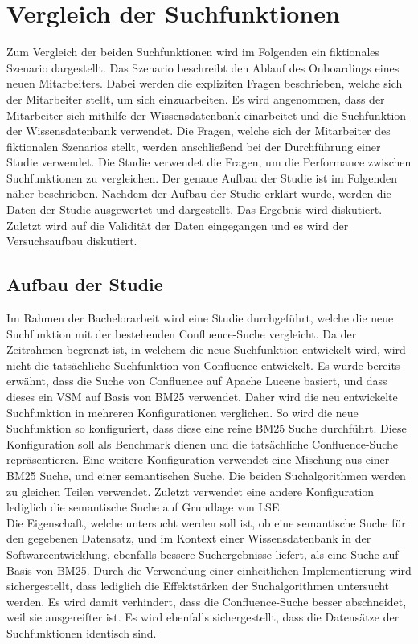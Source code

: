 \chapter{Vergleich der Suchfunktionen}
\label{chap:vergleich-der-suchfunktionen}

Zum Vergleich der beiden Suchfunktionen wird im Folgenden ein fiktionales Szenario dargestellt.
Das Szenario beschreibt den Ablauf des Onboardings eines neuen Mitarbeiters.
Dabei werden die expliziten Fragen beschrieben, welche sich der Mitarbeiter stellt, um sich einzuarbeiten.
Es wird angenommen, dass der Mitarbeiter sich mithilfe der Wissensdatenbank einarbeitet und die Suchfunktion der Wissensdatenbank verwendet.
Die Fragen, welche sich der Mitarbeiter des fiktionalen Szenarios stellt, werden anschließend bei der Durchführung einer Studie verwendet.
Die Studie verwendet die Fragen, um die Performance zwischen Suchfunktionen zu vergleichen.
Der genaue Aufbau der Studie ist im Folgenden näher beschrieben.
Nachdem der Aufbau der Studie erklärt wurde, werden die Daten der Studie ausgewertet und dargestellt.
Das Ergebnis wird diskutiert.
Zuletzt wird auf die Validität der Daten eingegangen und es wird der Versuchsaufbau diskutiert.

\section{Aufbau der Studie}
Im Rahmen der Bachelorarbeit wird eine Studie durchgeführt, welche die neue Suchfunktion mit der bestehenden Confluence-Suche vergleicht.
Da der Zeitrahmen begrenzt ist, in welchem die neue Suchfunktion entwickelt wird, wird nicht die tatsächliche Suchfunktion von Confluence entwickelt.
Es wurde bereits erwähnt, dass die Suche von Confluence auf Apache Lucene basiert, und dass dieses ein VSM auf Basis von BM25 verwendet.
Daher wird die neu entwickelte Suchfunktion in mehreren Konfigurationen verglichen.
So wird die neue Suchfunktion so konfiguriert, dass diese eine reine BM25 Suche durchführt.
Diese Konfiguration soll als Benchmark dienen und die tatsächliche Confluence-Suche repräsentieren.
Eine weitere Konfiguration verwendet eine Mischung aus einer BM25 Suche, und einer semantischen Suche.
Die beiden Suchalgorithmen werden zu gleichen Teilen verwendet.
Zuletzt verwendet eine andere Konfiguration lediglich die semantische Suche auf Grundlage von LSE.\\

Die Eigenschaft, welche untersucht werden soll ist, ob eine semantische Suche für den gegebenen Datensatz, und im Kontext einer Wissensdatenbank in der Softwareentwicklung, ebenfalls bessere Suchergebnisse liefert, als eine Suche auf Basis von BM25.
Durch die Verwendung einer einheitlichen Implementierung wird sichergestellt, dass lediglich die Effektstärken der Suchalgorithmen untersucht werden.
Es wird damit verhindert, dass die Confluence-Suche besser abschneidet, weil sie ausgereifter ist.
Es wird ebenfalls sichergestellt, dass die Datensätze der Suchfunktionen identisch sind.\\

